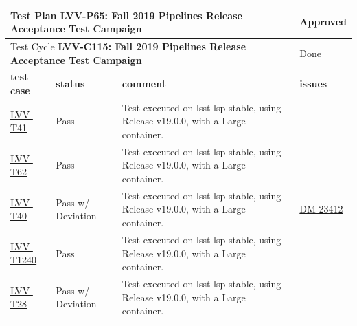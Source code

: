 \documentclass[DM,STR,toc]{lsstdoc}
\begin{document}
\begin{longtable}{p{2cm}p{2.5cm}p{9cm}p{2.5cm}}
\toprule
\multicolumn{3}{l}{ Test Plan {\bf LVV-P65:  Fall 2019 Pipelines Release Acceptance Test Campaign
 }} & Approved \\\hline

  \multicolumn{3}{l}{ Test Cycle {\bf LVV-C115:  Fall 2019 Pipelines Release Acceptance Test Campaign
 }} & Done \\\hline

  {\bf \footnotesize test case} & {\bf \footnotesize status} & {\bf \footnotesize comment} & {\bf \footnotesize issues} \\\toprule

\href{https://jira.lsstcorp.org/secure/Tests.jspa#/testCase/LVV-T41}{LVV-T41}
    & Pass &
    \begin{minipage}[]{9cm}
    \smallskip
     Test executed on lsst-lsp-stable, using Release v19.0.0, with a Large
container.

    \medskip
    \end{minipage}
    &
    \\\hline
\href{https://jira.lsstcorp.org/secure/Tests.jspa#/testCase/LVV-T62}{LVV-T62}
    & Pass &
    \begin{minipage}[]{9cm}
    \smallskip
     Test executed on lsst-lsp-stable, using Release v19.0.0, with a Large
container.

    \medskip
    \end{minipage}
    &
    \\\hline
\href{https://jira.lsstcorp.org/secure/Tests.jspa#/testCase/LVV-T40}{LVV-T40}
    & Pass w/ Deviation &
    \begin{minipage}[]{9cm}
    \smallskip
     Test executed on lsst-lsp-stable, using Release v19.0.0, with a Large
container.

    \medskip
    \end{minipage}
    &
          \href{https://jira.lsstcorp.org/browse/DM-23412}{DM-23412}
    \\\hline
\href{https://jira.lsstcorp.org/secure/Tests.jspa#/testCase/LVV-T1240}{LVV-T1240}
    & Pass &
    \begin{minipage}[]{9cm}
    \smallskip
     Test executed on lsst-lsp-stable, using Release v19.0.0, with a Large
container.

    \medskip
    \end{minipage}
    &
    \\\hline
\href{https://jira.lsstcorp.org/secure/Tests.jspa#/testCase/LVV-T28}{LVV-T28}
    & Pass w/ Deviation &
    \begin{minipage}[]{9cm}
    \smallskip
     Test executed on lsst-lsp-stable, using Release v19.0.0, with a Large
container.


\end{minipage}
\end{longtable}
\end{document}
